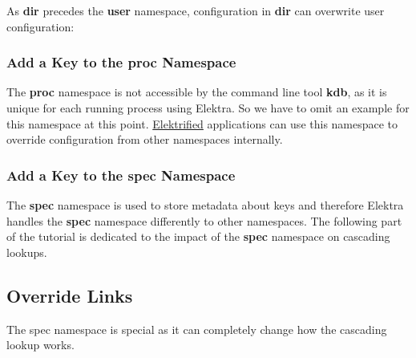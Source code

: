 As {\bfseries dir} precedes the {\bfseries user} namespace, configuration in {\bfseries dir} can overwrite user configuration\+:




\subsubsection*{Add a Key to the proc Namespace}

The {\bfseries proc} namespace is not accessible by the command line tool {\bfseries kdb}, as it is unique for each running process using Elektra. So we have to omit an example for this namespace at this point. \hyperlink{doc_help_elektra-glossary_md}{Elektrified} applications can use this namespace to override configuration from other namespaces internally.

\subsubsection*{Add a Key to the spec Namespace}

The {\bfseries spec} namespace is used to store metadata about keys and therefore Elektra handles the {\bfseries spec} namespace differently to other namespaces. The following part of the tutorial is dedicated to the impact of the {\bfseries spec} namespace on cascading lookups.

\subsection*{Override Links}

The {\ttfamily spec} namespace is special as it can completely change how the cascading lookup works.

